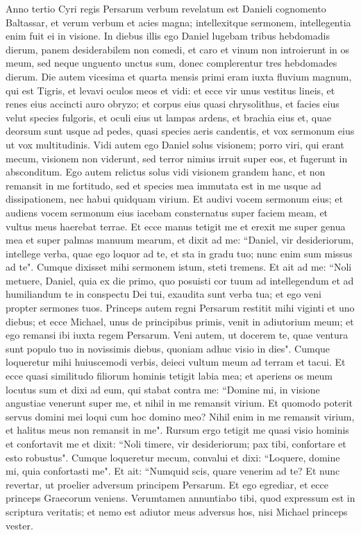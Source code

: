 \begin{biblechapter}  
\verse Anno tertio Cyri regis Persarum verbum revelatum est Danieli cognomento Baltassar, et verum verbum et acies magna; intellexitque sermonem, intellegentia enim fuit ei in visione. 
\verse In diebus illis ego Daniel lugebam tribus hebdomadis dierum, 
\verse panem desiderabilem non comedi, et caro et vinum non introierunt in os meum, sed neque unguento unctus sum, donec complerentur tres hebdomades dierum. 
\verse Die autem vicesima et quarta mensis primi eram iuxta fluvium magnum, qui est Tigris, 
\verse et levavi oculos meos et vidi: et ecce vir unus vestitus lineis, et renes eius accincti auro obryzo; 
\verse et corpus eius quasi chrysolithus, et facies eius velut species fulgoris, et oculi eius ut lampas ardens, et brachia eius et, quae deorsum sunt usque ad pedes, quasi species aeris candentis, et vox sermonum eius ut vox multitudinis. 
\verse Vidi autem ego Daniel solus visionem; porro viri, qui erant mecum, visionem non viderunt, sed terror nimius irruit super eos, et fugerunt in absconditum. 
\verse Ego autem relictus solus vidi visionem grandem hanc, et non remansit in me fortitudo, sed et species mea immutata est in me usque ad dissipationem, nec habui quidquam virium. 
\verse Et audivi vocem sermonum eius; et audiens vocem sermonum eius iacebam consternatus super faciem meam, et vultus meus haerebat terrae. 
\verse Et ecce manus tetigit me et erexit me super genua mea et super palmas manuum mearum, 
\verse et dixit ad me: “Daniel, vir desideriorum, intellege verba, quae ego loquor ad te, et sta in gradu tuo; nunc enim sum missus ad te". Cumque dixisset mihi sermonem istum, steti tremens. 
\verse Et ait ad me: “Noli metuere, Daniel, quia ex die primo, quo posuisti cor tuum ad intellegendum et ad humiliandum te in conspectu Dei tui, exaudita sunt verba tua; et ego veni propter sermones tuos. 
\verse Princeps autem regni Persarum restitit mihi viginti et uno diebus; et ecce Michael, unus de principibus primis, venit in adiutorium meum; et ego remansi ibi iuxta regem Persarum. 
\verse Veni autem, ut docerem te, quae ventura sunt populo tuo in novissimis diebus, quoniam adhuc visio in dies". 
\verse Cumque loqueretur mihi huiuscemodi verbis, deieci vultum meum ad terram et tacui. 
\verse Et ecce quasi similitudo filiorum hominis tetigit labia mea; et aperiens os meum locutus sum et dixi ad eum, qui stabat contra me: “Domine mi, in visione angustiae venerunt super me, et nihil in me remansit virium. 
\verse Et quomodo poterit servus domini mei loqui cum hoc domino meo? Nihil enim in me remansit virium, et halitus meus non remansit in me". 
\verse Rursum ergo tetigit me quasi visio hominis et confortavit me 
\verse et dixit: “Noli timere, vir desideriorum; pax tibi, confortare et esto robustus". Cumque loqueretur mecum, convalui et dixi: “Loquere, domine mi, quia confortasti me". 
\verse Et ait: “Numquid scis, quare venerim ad te? Et nunc revertar, ut proelier adversum principem Persarum. Et ego egrediar, et ecce princeps Graecorum veniens. 
\verse Verumtamen annuntiabo tibi, quod expressum est in scriptura veritatis; et nemo est adiutor meus adversus hos, nisi Michael princeps vester. 
\end{biblechapter}

